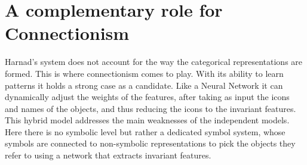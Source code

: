 \documentclass{article}
\begin{document}
	\section{A complementary role for Connectionism}
	Harnad's system does not account for the way the categorical representations are formed. This is where connectionism comes to play. With its ability to learn patterns it holds a strong case as a candidate. Like a Neural Network it can dynamically adjust the weights of the features, after taking as input the icons and names of the objects, and thus reducing the icons to the invariant features. This hybrid model addresses the main weaknesses of the independent models. Here there is no symbolic level but rather a dedicated symbol system, whose symbols are connected to non-symbolic representations to pick the objects they refer to using a network that extracts invariant features.
	
	
\end{document}
